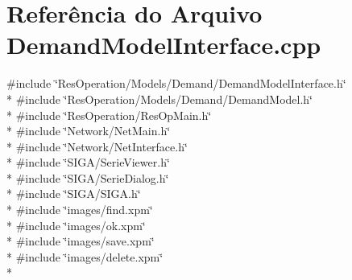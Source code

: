 \section{Referência do Arquivo Demand\+Model\+Interface.\+cpp}
\label{_demand_model_interface_8cpp}
{\ttfamily \#include \char`\"{}Res\+Operation/\+Models/\+Demand/\+Demand\+Model\+Interface.\+h\char`\"{}}\\*
{\ttfamily \#include \char`\"{}Res\+Operation/\+Models/\+Demand/\+Demand\+Model.\+h\char`\"{}}\\*
{\ttfamily \#include \char`\"{}Res\+Operation/\+Res\+Op\+Main.\+h\char`\"{}}\\*
{\ttfamily \#include \char`\"{}Network/\+Net\+Main.\+h\char`\"{}}\\*
{\ttfamily \#include \char`\"{}Network/\+Net\+Interface.\+h\char`\"{}}\\*
{\ttfamily \#include \char`\"{}S\+I\+G\+A/\+Serie\+Viewer.\+h\char`\"{}}\\*
{\ttfamily \#include \char`\"{}S\+I\+G\+A/\+Serie\+Dialog.\+h\char`\"{}}\\*
{\ttfamily \#include \char`\"{}S\+I\+G\+A/\+S\+I\+G\+A.\+h\char`\"{}}\\*
{\ttfamily \#include \char`\"{}images/find.\+xpm\char`\"{}}\\*
{\ttfamily \#include \char`\"{}images/ok.\+xpm\char`\"{}}\\*
{\ttfamily \#include \char`\"{}images/save.\+xpm\char`\"{}}\\*
{\ttfamily \#include \char`\"{}images/delete.\+xpm\char`\"{}}\\*
